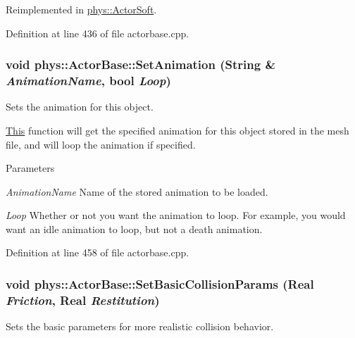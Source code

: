 Reimplemented in \hyperlink{classphys_1_1ActorSoft_ad1696a10b3057897ca503de013aaddc6}{phys::ActorSoft}.



Definition at line 436 of file actorbase.cpp.

\hypertarget{classphys_1_1ActorBase_a708ec161f50833323294aa7ddceee776}{
\subsubsection[{SetAnimation}]{\setlength{\rightskip}{0pt plus 5cm}void phys::ActorBase::SetAnimation ({\bf String} \& {\em AnimationName}, \/  bool {\em Loop})}}
\label{d8/d0f/classphys_1_1ActorBase_a708ec161f50833323294aa7ddceee776}


Sets the animation for this object. 

\hyperlink{structThis}{This} function will get the specified animation for this object stored in the mesh file, and will loop the animation if specified. 
\begin{DoxyParams}{Parameters}
\item[{\em AnimationName}]Name of the stored animation to be loaded. \item[{\em Loop}]Whether or not you want the animation to loop. For example, you would want an idle animation to loop, but not a death animation. \end{DoxyParams}


Definition at line 458 of file actorbase.cpp.

\hypertarget{classphys_1_1ActorBase_ac60e1ebd1a08882234a6d04aff745260}{
\subsubsection[{SetBasicCollisionParams}]{\setlength{\rightskip}{0pt plus 5cm}void phys::ActorBase::SetBasicCollisionParams ({\bf Real} {\em Friction}, \/  {\bf Real} {\em Restitution})}}
\label{d8/d0f/classphys_1_1ActorBase_ac60e1ebd1a08882234a6d04aff745260}


Sets the basic parameters for more realistic collision behavior. 

